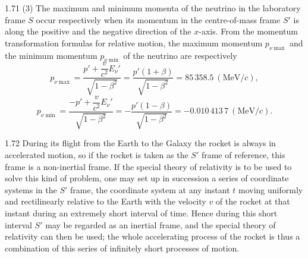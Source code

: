 \begin{solution}{1.71}
(3) The maximum and minimum momenta of the neutrino in the laboratory frame $S$ occur respectively when its momentum in the centre-of-mass frame $S'$ is along the positive and the negative direction of the $x$-axis. From the momentum transformation formulas for relative motion, the maximum momentum $p_{\nu\max}$ and the minimum momentum $p_{\nu\min}$ of the neutrino are respectively
\[
p_{\nu\max}=\frac{p'+\dfrac{v}{c^2}E_\nu'}{\sqrt{1-\beta^2}}
=\frac{p'(1+\beta)}{\sqrt{1-\beta^2}}=85\,358.5\ (\mathrm{MeV}/c),
\]
\[
p_{\nu\min}=\frac{-p'+\dfrac{v}{c^2}E_\nu'}{\sqrt{1-\beta^2}}
=-\frac{p'(1-\beta)}{\sqrt{1-\beta^2}}=-0.010\,413\,7\ (\mathrm{MeV}/c).
\]
\end{solution}

\begin{solution}{1.72}
During its flight from the Earth to the Galaxy the rocket is always in accelerated motion, so if the rocket is taken as the $S'$ frame of reference, this frame is a non-inertial frame. If the special theory of relativity is to be used to solve this kind of problem, one may set up in succession a series of coordinate systems in the $S'$ frame, the coordinate system at any instant $t$ moving uniformly and rectilinearly relative to the Earth with the velocity $v$ of the rocket at that instant during an extremely short interval of time. Hence during this short interval $S'$ may be regarded as an inertial frame, and the special theory of relativity can then be used; the whole accelerating process of the rocket is thus a combination of this series of infinitely short processes of motion.


\end{solution}
